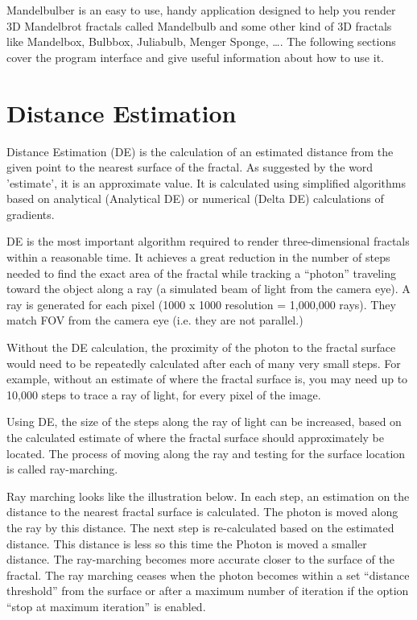 Mandelbulber is an easy to use, handy application designed to help you
render 3D Mandelbrot fractals called Mandelbulb and some other kind of
3D fractals like Mandelbox, Bulbbox, Juliabulb, Menger Sponge, \ldots{}.
The following sections cover the program interface and give useful
information about how to use it.

\section{Distance Estimation}\label{distance-estimation}

Distance Estimation (DE) is the calculation of an estimated distance
from the given point to the nearest surface of the fractal. As suggested
by the word 'estimate', it is an approximate value. It is calculated
using simplified algorithms based on analytical (Analytical DE) or
numerical (Delta DE) calculations of gradients.

DE is the most important algorithm required to render three-dimensional
fractals within a reasonable time. It achieves a great reduction in the
number of steps needed to find the exact area of the fractal while
tracking a ``photon'' traveling toward the object along a ray (a
simulated beam of light from the camera eye). A ray is generated for
each pixel (1000 x 1000 resolution = 1,000,000 rays). They match FOV
from the camera eye (i.e. they are not parallel.)

Without the DE calculation, the proximity of the photon to the fractal
surface would need to be repeatedly calculated after each of many very
small steps. For example, without an estimate of where the fractal
surface is, you may need up to 10,000 steps to trace a ray of light, for
every pixel of the image.

Using DE, the size of the steps along the ray of light can be increased,
based on the calculated estimate of where the fractal surface should
approximately be located. The process of moving along the ray and
testing for the surface location is called ray-marching.

Ray marching looks like the illustration below. In each step, an
estimation on the distance to the nearest fractal surface is calculated.
The photon is moved along the ray by this distance. The next step is
re-calculated based on the estimated distance. This distance is less so
this time the Photon is moved a smaller distance. The ray-marching
becomes more accurate closer to the surface of the fractal. The ray
marching ceases when the photon becomes within a set ``distance
threshold'' from the surface or after a maximum number of iteration if
the option ``stop at maximum iteration'' is enabled.

